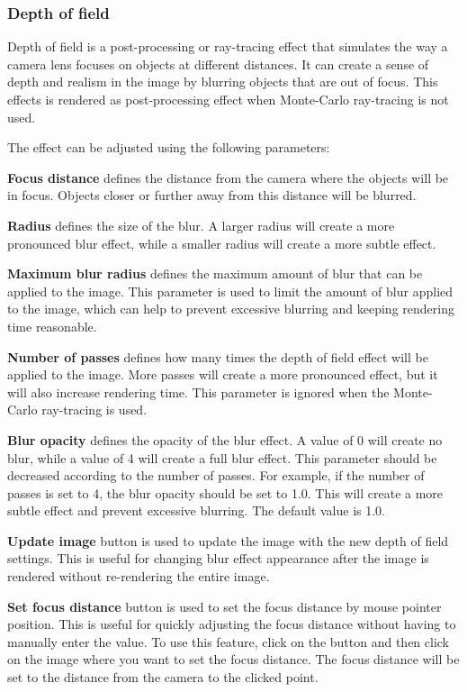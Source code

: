\subsubsection{Depth of field}\label{effects-ray-tracing-dof}

Depth of field is a post-processing or ray-tracing effect that simulates the way a camera lens focuses on objects at different distances. It can create a sense of depth and realism in the image by blurring objects that are out of focus. This effects is rendered as post-processing effect when Monte-Carlo ray-tracing is not used. 

The effect can be adjusted using the following parameters:

\textbf{Focus distance} defines the distance from the camera where the objects will be in focus. Objects closer or further away from this distance will be blurred.

\textbf{Radius} defines the size of the blur. A larger radius will create a more pronounced blur effect, while a smaller radius will create a more subtle effect.

\textbf{Maximum blur radius} defines the maximum amount of blur that can be applied to the image. This parameter is used to limit the amount of blur applied to the image, which can help to prevent excessive blurring and keeping rendering time reasonable.

\textbf{Number of passes} defines how many times the depth of field effect will be applied to the image. More passes will create a more pronounced effect, but it will also increase rendering time. This parameter is ignored when the Monte-Carlo ray-tracing is used.

\textbf{Blur opacity} defines the opacity of the blur effect. A value of 0 will create no blur, while a value of 4 will create a full blur effect. This parameter should be decreased according to the number of passes. For example, if the number of passes is set to 4, the blur opacity should be set to 1.0. This will create a more subtle effect and prevent excessive blurring. The default value is 1.0.


\textbf{Update image} button is used to update the image with the new depth of field settings. This is useful for changing blur effect appearance after the image is rendered without re-rendering the entire image. 

\textbf{Set focus distance} button is used to set the focus distance by mouse pointer position. This is useful for quickly adjusting the focus distance without having to manually enter the value. To use this feature, click on the button and then click on the image where you want to set the focus distance. The focus distance will be set to the distance from the camera to the clicked point.

